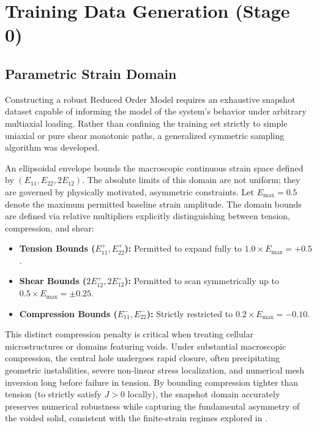 \documentclass[12pt,a4paper]{article}
\begin{document}
\section{Training Data Generation (Stage 0)}

\subsection{Parametric Strain Domain}

Constructing a robust Reduced Order Model requires an exhaustive snapshot dataset capable of informing the model of the system's behavior under arbitrary multiaxial loading. Rather than confining the training set strictly to simple uniaxial or pure shear monotonic paths, a generalized symmetric sampling algorithm was developed.

An ellipsoidal envelope bounds the macroscopic continuous strain space defined by $(E_{11}, E_{22}, 2E_{12})$. The absolute limits of this domain are not uniform; they are governed by physically motivated, asymmetric constraints. Let $E_{\text{max}} = 0.5$ denote the maximum permitted baseline strain amplitude. The domain bounds are defined via relative multipliers explicitly distinguishing between tension, compression, and shear:
\begin{itemize}
    \item \textbf{Tension Bounds ($E_{11}^+, E_{22}^+$):} Permitted to expand fully to $1.0 \times E_{\text{max}} = +0.5$.
    \item \textbf{Shear Bounds ($2E_{12}^+, 2E_{12}^-$):} Permitted to scan symmetrically up to $0.5 \times E_{\text{max}} = \pm 0.25$.
    \item \textbf{Compression Bounds ($E_{11}^-, E_{22}^-$):} Strictly restricted to $0.2 \times E_{\text{max}} = -0.10$.
\end{itemize}

This distinct compression penalty is critical when treating cellular microstructures or domains featuring voids. Under substantial macroscopic compression, the central hole undergoes rapid closure, often precipitating geometric instabilities, severe non-linear stress localization, and numerical mesh inversion long before failure in tension. By bounding compression tighter than tension (to strictly satisfy $J > 0$ locally), the snapshot domain accurately preserves numerical robustness while capturing the fundamental asymmetry of the voided solid, consistent with the finite-strain regimes explored in \cite{Bravo2024}.
\end{document}
